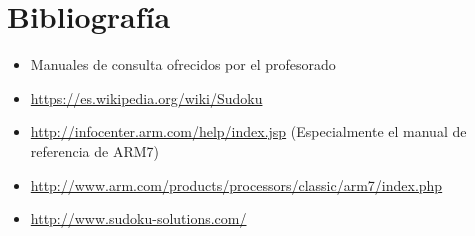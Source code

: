 \documentclass[12pt,letterpaper]{article}
\begin{document}
\section{Bibliograf\'ia}
\begin{itemize}
\item Manuales de consulta ofrecidos por el profesorado
\item \url{https://es.wikipedia.org/wiki/Sudoku}
\item \url{http://infocenter.arm.com/help/index.jsp} (Especialmente el
  manual de referencia de ARM7)
\item \url{http://www.arm.com/products/processors/classic/arm7/index.php}
\item \url{http://www.sudoku-solutions.com/}
\end{itemize}
\end{document}
